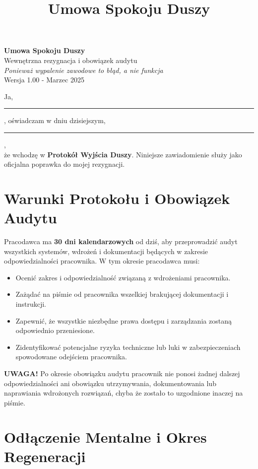 \documentclass[a4paper,11pt]{article}
\title{Umowa Spokoju Duszy}
\date{}
\begin{document}
\pagestyle{empty}

\begin{center}
    {\LARGE \textbf{Umowa Spokoju Duszy}}\\[1em]
    {\large Wewnętrzna rezygnacja i obowiązek audytu}\\[0.5em]
    \textit{Ponieważ wypalenie zawodowe to błąd, a nie funkcja}\\[0.5em]
    {\small Wersja 1.00 - Marzec 2025}
\end{center}

\vspace{2em}

Ja, \rule{7cm}{0.2pt}, oświadczam w dniu dzisiejszym, \rule{4cm}{0.2pt},\\
że wchodzę w \textbf{Protokół Wyjścia Duszy}. Niniejsze zawiadomienie służy jako oficjalna poprawka do mojej rezygnacji.

\section*{Warunki Protokołu i Obowiązek Audytu}

Pracodawca ma \textbf{30 dni kalendarzowych} od dziś, aby przeprowadzić audyt wszystkich systemów, wdrożeń i dokumentacji będących w zakresie odpowiedzialności pracownika. W tym okresie pracodawca musi:

\begin{itemize}
    \item Ocenić zakres i odpowiedzialność związaną z wdrożeniami pracownika.
    \item Zażądać na piśmie od pracownika wszelkiej brakującej dokumentacji i instrukcji.
    \item Zapewnić, że wszystkie niezbędne prawa dostępu i zarządzania zostaną odpowiednio przeniesione.
    \item Zidentyfikować potencjalne ryzyka techniczne lub luki w zabezpieczeniach spowodowane odejściem pracownika.
\end{itemize}

\textbf{UWAGA!} Po okresie obowiązku audytu pracownik nie ponosi żadnej dalszej odpowiedzialności ani obowiązku utrzymywania, dokumentowania lub naprawiania wdrożonych rozwiązań, chyba że zostało to uzgodnione inaczej na piśmie.

\section*{Odłączenie Mentalne i Okres Regeneracji}
\end{document}
